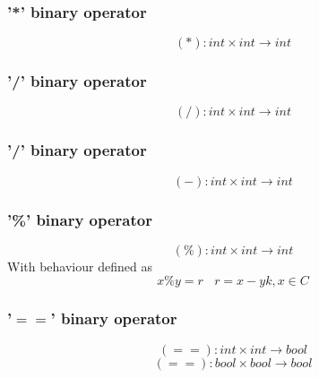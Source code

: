 \documentclass{article}
\begin{document}
\subsubsection{'*' binary operator}
$$
(*): int \times int \longrightarrow int
$$

\subsubsection{'/' binary operator}
$$
(/): int \times int \longrightarrow int
$$

\subsubsection{'/' binary operator}
$$
(-): int \times int \longrightarrow int
$$
\subsubsection{'\%' binary operator}
$$
(\%): int \times int \longrightarrow int
$$
With behaviour defined as
$$
x\%y = r \ \ \ \ r = x - yk, x \in C
$$

\subsubsection{'$==$' binary operator}
$$
(==): int \times int \longrightarrow bool
$$
$$
(==): bool \times bool \longrightarrow bool
$$
\end{document}
